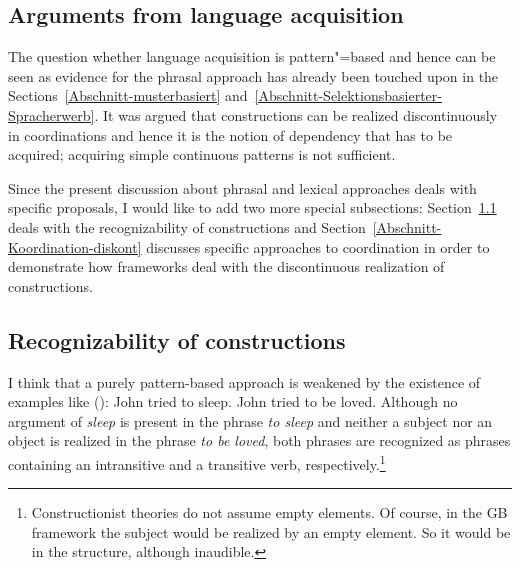 \begin{exe}
\begin{xlist}[iv.]
\begin{exe}
\begin{xlist}[iv.]
\section{Arguments from language acquisition}
\label{sec-acquisition}

The question whether language acquisition is pattern"=based and hence can be seen as evidence for
the phrasal approach has already been touched upon in the Sections~\ref{Abschnitt-musterbasiert}
and~\ref{Abschnitt-Selektionsbasierter-Spracherwerb}. It was argued that constructions can be
realized discontinuously in coordinations and hence it is the notion of
dependency that has to be acquired; acquiring simple continuous patterns is not sufficient.

Since the present discussion about phrasal and lexical approaches deals with specific proposals, I would like
to add two more special subsections: Section~\ref{sec-recognizability-of-constructions} deals with
the recognizability of constructions and Section~\ref{Abschnitt-Koordination-diskont} discusses specific approaches to coordination
in order to demonstrate how frameworks deal with the discontinuous realization of constructions.


\subsection{Recognizability of constructions}
\label{sec-recognizability-of-constructions}
 
\largerpage
I think that a purely pattern-based approach is weakened by the existence of examples like ():
\eal
\ex John tried to sleep.
\ex John tried to be loved.
\zl
Although no argument of \emph{sleep} is present in the phrase \emph{to sleep} and neither a subject
nor an object is realized in the phrase \emph{to be loved}, both phrases are recognized as phrases
containing an intransitive and a transitive verb, respectively.\footnote{%
Constructionist theories do not assume empty elements. Of course, in the GB framework the subject
would be realized by an empty element. So it would be in the structure, although inaudible.%
}  


\end{xlist}
\end{exe}
\end{xlist}
\end{exe}
